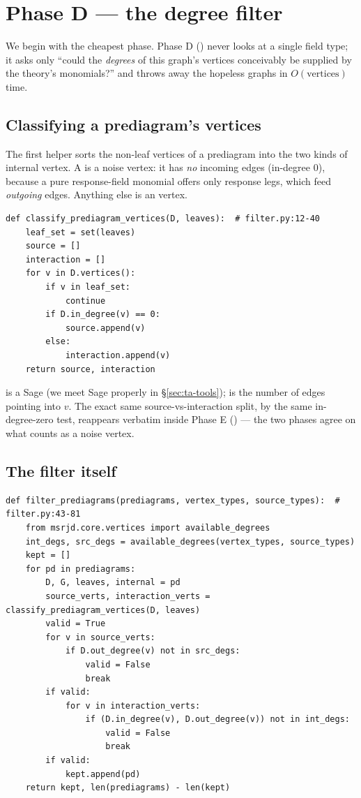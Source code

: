 \section{Phase D --- the degree filter}\label{sec:ta-filter}

We begin with the cheapest phase. Phase D
() never looks at a single field type; it asks
only ``could the \emph{degrees} of this graph's vertices conceivably be supplied
by the theory's monomials?'' and throws away the hopeless graphs in
$O(\text{vertices})$ time.

\subsection{Classifying a prediagram's vertices}

The first helper sorts the non-leaf vertices of a prediagram into the two kinds
of internal vertex. A  is a noise vertex: it has \emph{no} incoming
edges (in-degree $0$), because a pure response-field monomial offers only
response legs, which feed \emph{outgoing} edges. Anything else is an
 vertex.

\begin{lstlisting}
def classify_prediagram_vertices(D, leaves):  # filter.py:12-40
    leaf_set = set(leaves)
    source = []
    interaction = []
    for v in D.vertices():
        if v in leaf_set:
            continue
        if D.in_degree(v) == 0:
            source.append(v)
        else:
            interaction.append(v)
    return source, interaction
\end{lstlisting}

 is a Sage  (we meet Sage properly in
\S\ref{sec:ta-tools});  is the number of edges pointing
into $v$. The exact same source-vs-interaction split, by the same in-degree-zero
test, reappears verbatim inside Phase E
() --- the two phases agree on what counts as a
noise vertex.

\subsection{The filter itself}

\begin{lstlisting}
def filter_prediagrams(prediagrams, vertex_types, source_types):  # filter.py:43-81
    from msrjd.core.vertices import available_degrees
    int_degs, src_degs = available_degrees(vertex_types, source_types)
    kept = []
    for pd in prediagrams:
        D, G, leaves, internal = pd
        source_verts, interaction_verts = classify_prediagram_vertices(D, leaves)
        valid = True
        for v in source_verts:
            if D.out_degree(v) not in src_degs:
                valid = False
                break
        if valid:
            for v in interaction_verts:
                if (D.in_degree(v), D.out_degree(v)) not in int_degs:
                    valid = False
                    break
        if valid:
            kept.append(pd)
    return kept, len(prediagrams) - len(kept)
\end{lstlisting}

